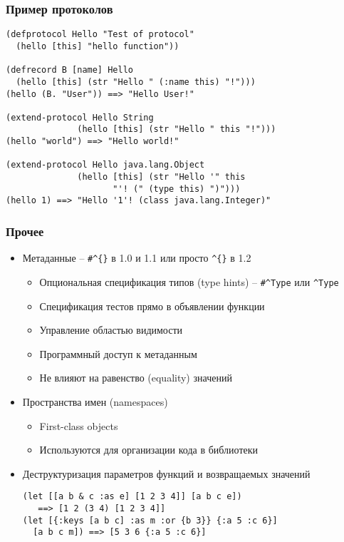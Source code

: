\documentclass[ignorenonframetext]{beamer}
\begin{document}
\begin{frame}[fragile]
  \frametitle{Пример протоколов}
\begin{lstlisting}
(defprotocol Hello "Test of protocol"
  (hello [this] "hello function"))

(defrecord B [name] Hello
  (hello [this] (str "Hello " (:name this) "!")))
(hello (B. "User")) ==> "Hello User!"

(extend-protocol Hello String
              (hello [this] (str "Hello " this "!")))
(hello "world") ==> "Hello world!"

(extend-protocol Hello java.lang.Object
              (hello [this] (str "Hello '" this 
                     "'! (" (type this) ")")))
(hello 1) ==> "Hello '1'! (class java.lang.Integer)"
\end{lstlisting}
\end{frame}

\begin{frame}[fragile,t]
  \frametitle{Прочее}
  \begin{itemize}
  \item Метаданные -- \lstinline!#^{}! в 1.0 и 1.1 или просто \lstinline!^{}! в 1.2
    \begin{itemize}
    \item Опциональная спецификация типов (type hints) -- \lstinline!#^Type! или \lstinline!^Type!
    \item Спецификация тестов прямо в объявлении функции
    \item Управление областью видимости
    \item Программный доступ к метаданным
    \item Не влияют на равенство (equality) значений
    \end{itemize}
  \item Пространства имен (namespaces)
    \begin{itemize}
    \item First-class objects
    \item Используются для организации кода в библиотеки
    \end{itemize}
  \item Деструктуризация параметров функций и возвращаемых значений
\begin{lstlisting}
(let [[a b & c :as e] [1 2 3 4]] [a b c e]) 
   ==> [1 2 (3 4) [1 2 3 4]]
(let [{:keys [a b c] :as m :or {b 3}} {:a 5 :c 6}]
  [a b c m]) ==> [5 3 6 {:a 5 :c 6}]
\end{lstlisting}
  \end{itemize}
\end{frame}
\end{document}
